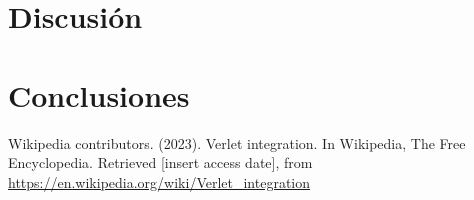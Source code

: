 \documentclass[twocolumn]{article}
\begin{document}
\section{Discusión}

\section{Conclusiones}

\begin{thebibliography}{9}
 Wikipedia contributors. (2023). Verlet integration. In Wikipedia, The Free Encyclopedia. Retrieved [insert access date], from \url{https://en.wikipedia.org/wiki/Verlet_integration}
\end{thebibliography}
\end{document}
